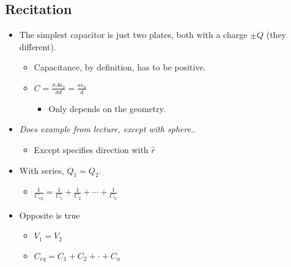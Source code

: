 \documentclass[11pt]{article}
\begin{document}
\subsection{Recitation}
\begin{itemize}
    \item The simplest capacitor is just two plates, both with a charge $\pm Q$ (they different).
    \begin{itemize}
        \item Capacitance, by definition, has to be positive.
        \item $C = \frac{\sigma A \epsilon _0}{\sigma d} = \frac{\kappa \epsilon _0}{d}$
        \begin{itemize}
             \item Only depends on the geometry.
         \end{itemize}
    \end{itemize}

    \item \textit{Does example from lecture, except with sphere.}.
    \begin{itemize}
         \item Except specifies direction with $\hat{r}$
     \end{itemize}

     \item With series, $Q_1 = Q_2$.
    \begin{itemize}
        \item $\frac{1}{C_{eq}} = \frac{1}{C_1} + \frac{1}{C_2} + \cdots + \frac{1}{C_n}$
    \end{itemize}

    \item Opposite is true
    \begin{itemize}
        \item  $V_1 = V_2$
         \item $C_{eq} = C_1 + C_2 + \cdot + C_n$
     \end{itemize}
\end{itemize}
\end{document}
